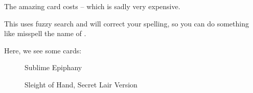 \documentclass[a4paper]{scrartcl}
\begin{document}
	The amazing card  costs  -- which is sadly very expensive.

	This uses fuzzy search and will correct your spelling, so you can do something like misspell the name of .

	Here, we see some cards:
	\begin{figure}[h]
		\caption{Sublime Epiphany}
	\end{figure}
	\begin{figure}[h]
		\caption{Sleight of Hand, Secret Lair Version}
	\end{figure}
\end{document}
